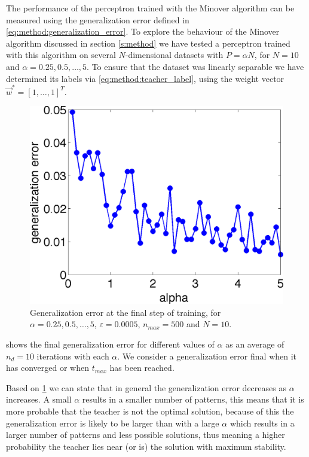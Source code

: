 The performance of the perceptron trained with the Minover algorithm can be measured using the generalization error defined in \autoref{eq:method:generalization_error}. To explore the behaviour of the Minover algorithm discussed in section \ref{s:method} we have tested a perceptron trained with this algorithm on several $N$-dimensional datasets with $P = \alpha N$, for $N = 10$ and $\alpha = 0.25, 0.5, \dotsc, 5$. To ensure that the dataset was linearly separable we have determined its labels via \eqref{eq:method:teacher_label}, using the weight vector $\vec{w}^* = [1, \dotsc, 1]^T$.\\

\begin{figure}
	\centering
	\includegraphics[width=0.9\columnwidth]{./img/finalgeneralizationerrors}
	\caption{Generalization error at the final step of training, for $\alpha = 0.25, 0.5, \dotsc, 5$, $\varepsilon = 0.0005$, $n_{max} = 500$ and $N = 10$.}
	\label{fig:exp:finalgeneralizationError}
\end{figure}

 shows the final generalization error for different values of $\alpha$ as an average of $n_d = 10$ iterations with each $\alpha$. We consider a generalization error final when it has converged or when $t_{max}$ has been reached. 

Based on \cref{fig:exp:finalgeneralizationError} we can state that in general the generalization error decreases as $\alpha$ increases. A small $\alpha$ results in a smaller number of patterns, this means that it is more probable that the teacher is not the optimal solution, because of this the generalization error is likely to be larger than with a large $\alpha$ which results in a larger number of patterns and less possible solutions, thus meaning a higher probability the teacher lies near (or is) the solution with maximum stability.

